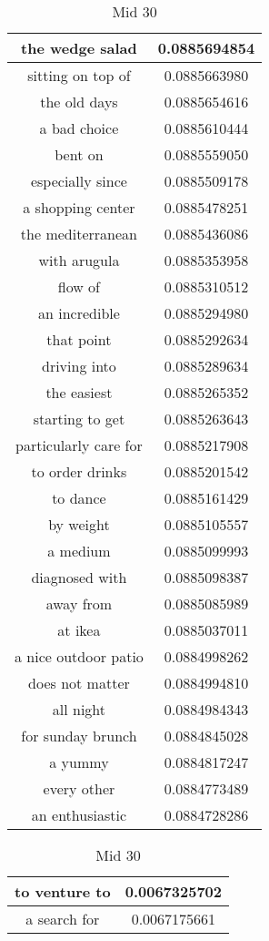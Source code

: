 \documentclass{article}
\begin{document}
\begin{table}[ht]
{\begin{tabular}{|c|c|}
\hline
the wedge salad & 0.0885694854\\
\hline
sitting on top of & 0.0885663980\\
\hline
the old days & 0.0885654616\\
\hline
a bad choice & 0.0885610444\\
\hline
bent on & 0.0885559050\\
\hline
especially since & 0.0885509178\\
\hline
a shopping center & 0.0885478251\\
\hline
the mediterranean & 0.0885436086\\
\hline
with arugula & 0.0885353958\\
\hline
flow of & 0.0885310512\\
\hline
an incredible & 0.0885294980\\
\hline
that point & 0.0885292634\\
\hline
driving into & 0.0885289634\\
\hline
the easiest & 0.0885265352\\
\hline
starting to get & 0.0885263643\\
\hline
particularly care for & 0.0885217908\\
\hline
to order drinks & 0.0885201542\\
\hline
to dance & 0.0885161429\\
\hline
by weight & 0.0885105557\\
\hline
a medium & 0.0885099993\\
\hline
diagnosed with & 0.0885098387\\
\hline
away from & 0.0885085989\\
\hline
at ikea & 0.0885037011\\
\hline
a nice outdoor patio & 0.0884998262\\
\hline
does not matter & 0.0884994810\\
\hline
all night & 0.0884984343\\
\hline
for sunday brunch & 0.0884845028\\
\hline
a yummy & 0.0884817247\\
\hline
every other & 0.0884773489\\
\hline
an enthusiastic & 0.0884728286\\
\hline
\end{tabular}
\caption{Mid 30}
}
\hfill
\parbox{.24\linewidth}{
\centering
\begin{tabular}{|c|c|}
\hline
to venture to & 0.0067325702\\
\hline
a search for & 0.0067175661\\

\end{tabular}}
\end{table}
\end{document}
